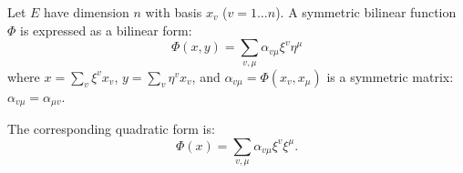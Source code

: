 Let $E$ have dimension $n$ with basis $x_v$ ($v = 1 \dots n$). A symmetric bilinear function $\Phi$ is expressed as a bilinear form:
$$\Phi(x, y) = \sum_{v, \mu} \alpha_{v\mu} \xi^v \eta^\mu$$
where $x = \sum_v \xi^v x_v$, $y = \sum_v \eta^v x_v$, and $\alpha_{v\mu} = \Phi(x_v, x_\mu)$ is a symmetric matrix: $\alpha_{v\mu} = \alpha_{\mu v}$.

The corresponding quadratic form is:
$$\Phi(x) = \sum_{v, \mu} \alpha_{v\mu} \xi^v \xi^\mu.$$
